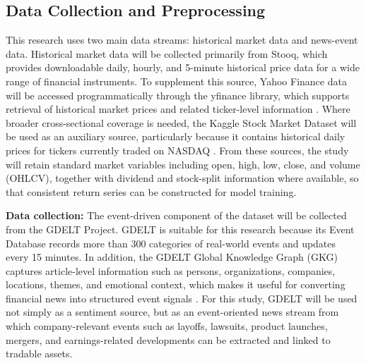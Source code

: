 \documentclass[a4paper,fleqn]{cas-sc}
\begin{document}
\subsection{Data Collection and Preprocessing}\label{sec:Research}
This research uses two main data streams: historical market data and news-event data. Historical market data will be collected primarily from Stooq, which provides downloadable daily, hourly, and 5-minute historical price data for a wide range of financial instruments. To supplement this source, Yahoo Finance data will be accessed programmatically through the yfinance library, which supports retrieval of historical market prices and related ticker-level information \cite{stooq_fpr}. Where broader cross-sectional coverage is needed, the Kaggle Stock Market Dataset will be used as an auxiliary source, particularly because it contains historical daily prices for tickers currently traded on NASDAQ \cite{aroussi_yfinance} . From these sources, the study will retain standard market variables including open, high, low, close, and volume (OHLCV), together with dividend and stock-split information where available, so that consistent return series can be constructed for model training.  \par
\noindent\textbf{Data collection: } The event-driven component of the dataset will be collected from the GDELT Project. GDELT is suitable for this research because its Event Database records more than 300 categories of real-world events and updates every 15 minutes. In addition, the GDELT Global Knowledge Graph (GKG) captures article-level information such as persons, organizations, companies, locations, themes, and emotional context, which makes it useful for converting financial news into structured event signals \cite{gdelt_gkg}. For this study, GDELT will be used not simply as a sentiment source, but as an event-oriented news stream from which company-relevant events such as layoffs, lawsuits, product launches, mergers, and earnings-related developments can be extracted and linked to tradable assets. \par 
\end{document}
